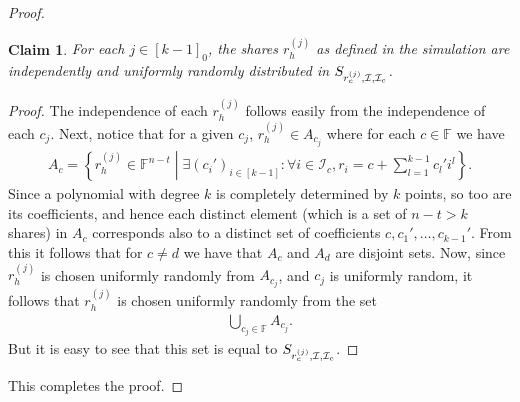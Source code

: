 \documentclass{article}
\newcommand{\set}[2]{\left\{ #1 \middle| #2 \right\}}
\newcommand{\seq}[1]{\left[#1\right]}
\newcommand{\seqZ}[1]{\left[#1\right]_0}
\newtheorem{claim}{Claim}
\theoremstyle{remark}
\newcommand{\F}{\mathbb{F}}
\begin{document}
\begin{proof}
	\begin{claim}
		For each $j \in \seqZ{k-1}$, the shares $r_h^{(j)}$ as defined in the
		simulation are independently and uniformly randomly distributed in
		$S_{r_c^{(j)}, \mathcal{I}, \mathcal{I}_c}$.
	\end{claim}

	\begin{proof}
		The independence of each $r_h^{(j)}$ follows easily from the
		independence of each $c_j$. Next, notice that for a given $c_j$,
		$r_h^{(j)} \in A_{c_j}$ where for each $c \in \F$ we have
		\begin{align*}
			A_c
			=
			\set{%
				r_h^{(j)} \in \F^{n-t}
			}{%
				\exists {(c_i')}_{i \in \seq{k-1}}:
				\forall i \in \mathcal{I}_c,
				r_i = c + \sum_{l=1}^{k-1} c_l' i^l
			}.
		\end{align*}
		Since a polynomial with degree $k$ is completely determined by $k$
		points, so too are its coefficients, and hence each distinct element
		(which is a set of $n-t > k$ shares) in $A_c$ corresponds also to a
		distinct set of coefficients $c, c_1', \ldots, c_{k-1}'$. From this it
		follows that for $c \ne d$ we have that $A_c$ and $A_d$ are disjoint
		sets. Now, since $r_h^{(j)}$ is chosen uniformly randomly from
		$A_{c_j}$, and $c_j$ is uniformly random, it follows that $r_h^{(j)}$
		is chosen uniformly randomly from the set
		\begin{align*}
			\bigcup_{c_j \in \F} A_{c_j}.
		\end{align*}
		But it is easy to see that this set is equal to
		$S_{r_c^{(j)}, \mathcal{I}, \mathcal{I}_c}$.
	\end{proof}

	This completes the proof.
\end{proof}
\end{document}
